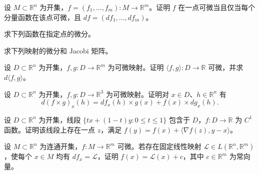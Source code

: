\newpage
\noindent\begin{minipage}{\textwidth}
设 $M\subset\mathbb R^n$ 为开集，$f=(f_1,\ldots,f_m):M\to\mathbb R^m$。证明 $f$ 在一点可微当且仅当每个分量函数在该点可微，且 $df=(df_1,\ldots,df_m)$。
\end{minipage}\par\vfill
\noindent\begin{minipage}{\textwidth}
求下列函数在指定点的微分。
\end{minipage}\par\vfill
\noindent\begin{minipage}{\textwidth}
求下列映射的微分和 Jacobi 矩阵。
\end{minipage}\par\vfill
\noindent\begin{minipage}{\textwidth}
设 $D\subset\mathbb R^n$ 为开集，$f,g:D\to\mathbb R^m$ 为可微映射。证明 $\langle f,g\rangle:D\to\mathbb R$ 可微，并求 $d\langle f,g\rangle$。
\end{minipage}\par\vfill
\newpage
\noindent\begin{minipage}{\textwidth}
设 $D\subset\mathbb R^n$ 为开集，$f,g:D\to\mathbb R^3$ 为可微映射。证明对 $x\in D$、$h\in\mathbb R^n$ 有\[d(f\times g)_x(h)=df_x(h)\times g(x)+f(x)\times dg_x(h).\]
\end{minipage}\par\vfill
\noindent\begin{minipage}{\textwidth}
设 $D\subset\mathbb R^n$ 为开集，线段 $\{tx+(1-t)y:0\le t\le1\}$ 包含于 $D$，$f:D\to\mathbb R$ 为 $C^1$ 函数。证明该线段上存在一点 $z$，满足 $f(y)=f(x)+\langle\nabla f(z),y-x\rangle$。
\end{minipage}\par\vfill
\noindent\begin{minipage}{\textwidth}
设 $M\subset\mathbb R^n$ 为连通开集，$f:M\to\mathbb R^m$ 可微。若存在固定线性映射 $\mathcal L\in L(\mathbb R^n,\mathbb R^m)$，使每个 $x\in M$ 均有 $df_x=\mathcal L$，证明 $f(x)=\mathcal L(x)+c$，其中 $c\in\mathbb R^m$ 为常向量。
\end{minipage}\par\vfill
